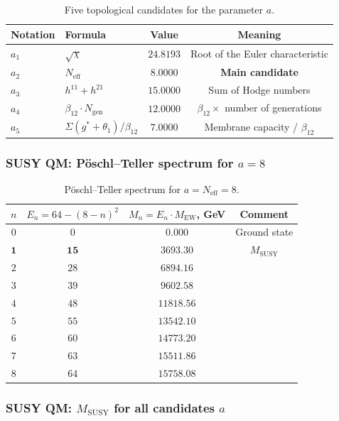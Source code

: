 \documentclass[11pt,a4paper]{article}
\theoremstyle{definition}
\begin{document}
\begin{table}[ht]
\centering
\caption{Five topological candidates for the parameter \texorpdfstring{$a$}{a}.}
\label{tab:app-five-a}
\begin{tabular}{llcc}
\toprule
Notation & Formula & Value & Meaning \\
\midrule
$a_1$ & $\sqrt{\chi}$ & $24.8193$ & Root of the Euler characteristic \\
$a_2$ & $N_{\text{eff}}$ & $8.0000$ & \textbf{Main candidate} \\
$a_3$ & $h^{11} + h^{21}$ & $15.0000$ & Sum of Hodge numbers \\
$a_4$ & $\beta_{12} \cdot N_{\text{gen}}$ & $12.0000$ & $\beta_{12} \times$ number of generations \\
$a_5$ & $\Sigma(g^*+\theta_1)/\beta_{12}$ & $7.0000$ & Membrane capacity / $\beta_{12}$ \\
\bottomrule
\end{tabular}
\end{table}

\subsubsection{SUSY QM: P\"oschl--Teller spectrum for \texorpdfstring{$a = 8$}{a = 8}}

\begin{table}[ht]
\centering
\caption{P\"oschl--Teller spectrum for $a = N_{\text{eff}} = 8$.}
\label{tab:app-susy-spectrum}
\begin{tabular}{cccc}
\toprule
$n$ & $E_n = 64 - (8-n)^2$ & $M_n = E_n \cdot M_{\text{EW}}$, GeV & Comment \\
\midrule
$0$ & $0$ & $0.000$ & Ground state \\
$\mathbf{1}$ & $\mathbf{15}$ & $\mathbf{3693.30}$ & $M_{\text{SUSY}}$ \\
$2$ & $28$ & $6894.16$ & \\
$3$ & $39$ & $9602.58$ & \\
$4$ & $48$ & $11818.56$ & \\
$5$ & $55$ & $13542.10$ & \\
$6$ & $60$ & $14773.20$ & \\
$7$ & $63$ & $15511.86$ & \\
$8$ & $64$ & $15758.08$ & \\
\bottomrule
\end{tabular}
\end{table}

\subsubsection{SUSY QM: \texorpdfstring{$M_{\text{SUSY}}$}{M\_SUSY} for all candidates \texorpdfstring{$a$}{a}}
\end{document}
